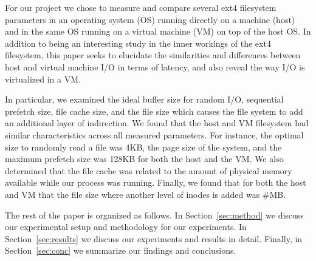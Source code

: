 For our project we chose to measure and compare several ext4 filesystem parameters
in an operating system (OS) running directly on a machine (host) and in the same 
OS running on a virtual machine (VM) on top of the host OS. In addition to being an 
interesting study in the inner workings of the ext4 filesystem, this paper seeks to
elucidate the similarities and differences between host and virtual machine I/O in
terms of latency, and also reveal the way I/O is virtualized in a VM.

In particular, we examined the ideal buffer size for random I/O, sequential 
prefetch size, file cache size, and the file size which causes the file system 
to add an additional layer of indirection. We found that the host and VM filesystem
had similar characteristics across all measured parameters. For instance, the 
optimal size to randomly read a file was 4KB, the page size of the system, and 
the maximum prefetch size was 128KB for both the host and the VM. We also 
determined that the file cache was related to the amount of physical memory 
available while our process was running. Finally, we found that for both the host
and VM that the file size where another level of inodes is added was \#MB.

The rest of the paper is organized as follows. In Section~\ref{sec:method} we 
discuss our experimental setup and methodology for our experiments. In 
Section~\ref{sec:results} we discuss our experiments and results in detail. 
Finally, in Section~\ref{sec:conc} we summarize our findings and conclusions.


